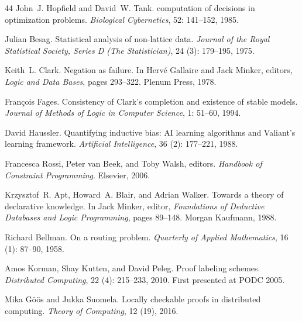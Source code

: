 \documentclass[10pt]{article}
\begin{document}
\begin{thebibliography}{44}
John~J. Hopfield and David~W. Tank.
 computation of decisions in optimization problems.
\newblock \emph{Biological Cybernetics}, 52: 141--152, 1985.

Julian Besag.
\newblock Statistical analysis of non-lattice data.
\newblock \emph{Journal of the Royal Statistical Society, Series D (The
  Statistician)}, 24 (3): 179--195, 1975.

Keith~L. Clark.
\newblock Negation as failure.
\newblock In Herv{\'e} Gallaire and Jack Minker, editors, \emph{Logic and Data
  Bases}, pages 293--322. Plenum Press, 1978.

Fran{\c{c}}ois Fages.
\newblock Consistency of {C}lark's completion and existence of stable models.
\newblock \emph{Journal of Methods of Logic in Computer Science}, 1:
  51--60, 1994.

David Haussler.
\newblock Quantifying inductive bias: {AI} learning algorithms and {V}aliant's
  learning framework.
\newblock \emph{Artificial Intelligence}, 36 (2): 177--221,
  1988.

Francesca Rossi, Peter van Beek, and Toby Walsh, editors.
\newblock \emph{Handbook of Constraint Programming}.
\newblock Elsevier, 2006.

Krzysztof~R. Apt, Howard~A. Blair, and Adrian Walker.
\newblock Towards a theory of declarative knowledge.
\newblock In Jack Minker, editor, \emph{Foundations of Deductive Databases and
  Logic Programming}, pages 89--148. Morgan Kaufmann, 1988.

Richard Bellman.
\newblock On a routing problem.
\newblock \emph{Quarterly of Applied Mathematics}, 16 (1):
  87--90, 1958.

Amos Korman, Shay Kutten, and David Peleg.
\newblock Proof labeling schemes.
\newblock \emph{Distributed Computing}, 22 (4): 215--233,
  2010.
\newblock First presented at PODC 2005.

Mika G{\"o}{\"o}s and Jukka Suomela.
\newblock Locally checkable proofs in distributed computing.
\newblock \emph{Theory of Computing}, 12 (19), 2016.


\end{thebibliography}
\end{document}
